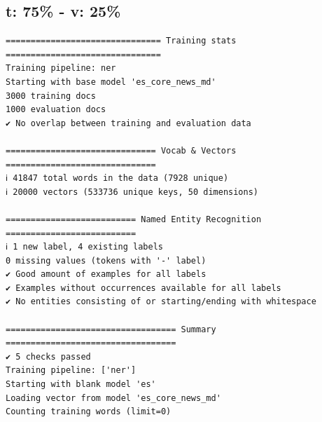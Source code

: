 \documentclass[12pt,a4paper,]{scrartcl}
\begin{document}
\hypertarget{t-75---v-25}{%
\subsection{t: 75\% - v: 25\%}\label{t-75---v-25}}

\begin{verbatim}
=============================== Training stats ===============================
Training pipeline: ner
Starting with base model 'es_core_news_md'
3000 training docs
1000 evaluation docs
✔ No overlap between training and evaluation data

============================== Vocab & Vectors ==============================
ℹ 41847 total words in the data (7928 unique)
ℹ 20000 vectors (533736 unique keys, 50 dimensions)

========================== Named Entity Recognition ==========================
ℹ 1 new label, 4 existing labels
0 missing values (tokens with '-' label)
✔ Good amount of examples for all labels
✔ Examples without occurrences available for all labels
✔ No entities consisting of or starting/ending with whitespace

================================== Summary ==================================
✔ 5 checks passed
Training pipeline: ['ner']
Starting with blank model 'es'
Loading vector from model 'es_core_news_md'
Counting training words (limit=0)
\end{verbatim}
\end{document}
